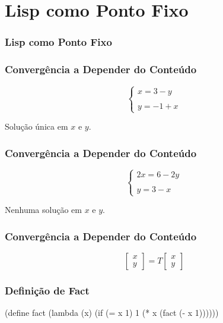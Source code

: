 
\section{Lisp como Ponto Fixo}

\begin{frame}
  \frametitle{Lisp como Ponto Fixo}
\end{frame}

\begin{frame}
  \frametitle{Convergência a Depender do Conteúdo}
  \[\begin{cases}
    x = 3 - y \\ \\ y = -1 + x
  \end{cases}\]

  \vspace{1cm}

  Solução única em $x$ e $y$.
\end{frame}

\begin{frame}
  \frametitle{Convergência a Depender do Conteúdo}
  \[\begin{cases}
    2x = 6 - 2y \\ \\ y = 3 - x
  \end{cases}\]

  \vspace{1cm}

  Nenhuma solução em $x$ e $y$.
\end{frame}

\begin{frame}
  \frametitle{Convergência a Depender do Conteúdo}
  \[
    \begin{bmatrix}
      x \\ y
    \end{bmatrix}
    =
    T
    \begin{bmatrix}
      x \\ y
    \end{bmatrix}
  \]
\end{frame}

\begin{frame}[fragile]
  \frametitle{Definição de Fact}
  \begin{code}
  (define fact
    (lambda (x)
      (if (= x 1)
          1
          (* x (fact (- x 1))))))
  \end{code}
\end{frame}

